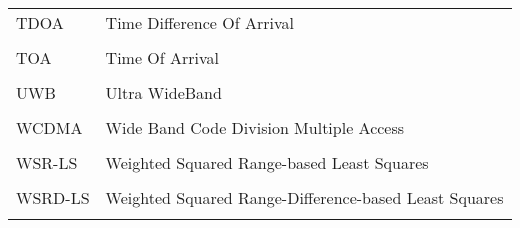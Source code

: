 \begin{longtable}[h]{l l}
TDOA &  Time Difference Of Arrival \\
\\
TOA & Time Of Arrival \\
\\
UWB & Ultra WideBand \\
\\
WCDMA & Wide Band Code Division Multiple Access \\
\\
WSR-LS & Weighted Squared Range-based Least Squares \\
\\
WSRD-LS & Weighted Squared Range-Difference-based Least Squares \\
\\
\end{longtable}
